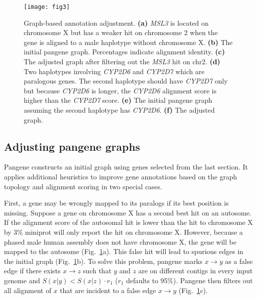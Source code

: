 \documentclass[webpdf,contemporary,large,namedate]{oup-authoring-template}%
\begin{document}
\begin{figure}[tb!]
\centering
\texttt{[image: fig3]}
\caption{Graph-based annotation adjustment.
{\bf (a)} \emph{MSL3} is located on chromosome X but has a weaker hit on chromosome 2 when the gene
is aligned to a male haplotype without chromosome X.
{\bf (b)} The initial pangene graph. Percentages indicate alignment identity.
{\bf (c)} The adjusted graph after filtering out the \emph{MSL3} hit on chr2.
{\bf (d)} Two haplotypes involving \emph{CYP2D6} and \emph{CYP2D7} which are paralogous genes.
The second haplotype should have \emph{CYP2D7} only but because \emph{CYP2D6} is longer, the \emph{CYP2D6} alignment score is higher than the \emph{CYP2D7} score.
{\bf (e)} The initial pangene graph assuming the second haplotype has \emph{CYP2D6}.
{\bf (f)} The adjusted graph.
}\label{fig:resolve}
\end{figure}

\subsection{Adjusting pangene graphs}\label{sec:adj}

Pangene constructs an initial graph using genes selected from the last section.
It applies additional heuristics to improve gene annotations based on the graph topology and alignment scoring
in two special cases.

First, a gene may be wrongly mapped to its paralogs if its best position is missing.
Suppose a gene on chromosome X has a second best hit on an autosome.
If the alignment score of the autosomal hit is lower than the hit to chromosome X by 3\%
miniprot will only report the hit on chromosome X.
However, because a phased male human assembly does not have chromosome X,
the gene will be mapped to the autosome (Fig.~\ref{fig:resolve}a).
This false hit will lead to spurious edges in the initial graph (Fig.~\ref{fig:resolve}b).
To solve this problem, pangene marks $x\to y$ as a false edge
if there exists $x\to z$ such that $y$ and $z$ are on different contigs in every input genome and $S(x|y)<S(x|z)\cdot r_1$ ($r_1$ defaults to 95\%).
Pangene then filters out all alignment of $x$ that are incident to a false edge $x\to y$ (Fig.~\ref{fig:resolve}c).
\end{document}

